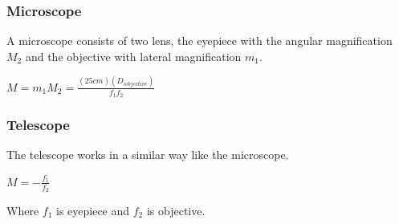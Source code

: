 \documentclass[a4paper]{article}
\begin{document}
\subsubsection{Microscope}
A microscope consists of two lens, the eyepiece with the angular magnification $M_2$ and the objective with lateral magnification $m_1$.
\begin{center}
$\displaystyle M = m_1M_2 = \frac{(25cm)(D_{i objective})}{f_1f_2}$
\end{center}
\subsubsection{Telescope}
The telescope works in a similar way like the microscope.
\begin{center}
$M = \displaystyle-\frac{f_1}{f_2}$
\end{center}
Where $f_1$ is eyepiece and $f_2$ is objective.
\begin{center}
\vfill
{}
\end{center}
\end{document}
